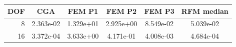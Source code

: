 \begin{tabular}{rccccc}
\toprule
DOF & CGA & FEM P1 & FEM P2 & FEM P3 & RFM median \\
\midrule
8 & 2.363e-02 & 1.329e+01 & 2.925e+00 & 8.549e-02 & 5.039e-02 \\
16 & 3.372e-04 & 3.633e+00 & 4.171e-01 & 4.008e-03 & 4.684e-04 \\
\bottomrule
\end{tabular}
